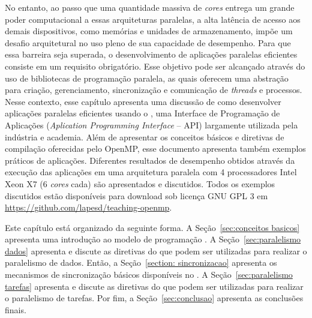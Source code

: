 \documentclass{SBCbookchapter}
\begin{document}
	No entanto, ao passo que uma quantidade massiva de \textit{cores}
	entrega um grande poder computacional a essas arquiteturas
	paralelas, a alta latência de acesso aos demais dispositivos, como
	memórias e unidades de armazenamento, impõe um desafio arquitetural
	no uso pleno de sua capacidade de desempenho. Para que essa barreira
	seja superada, o desenvolvimento de aplicações paralelas eficientes
	consiste em um requisito obrigatório. Esse objetivo pode ser
	alcançado através do uso de bibliotecas de programação paralela, as
	quais oferecem uma abstração para criação, gerenciamento,
	sincronização e comunicação de \textit{threads} e processos. Nesse
	contexto, esse capítulo apresenta uma discussão de como desenvolver
	aplicações paralelas eficientes usando o \openmp, uma Interface de
	Programação de Aplicações (\textit{Aplication Programming Interface}
	-- API) largamente utilizada pela indústria e academia. Além de apresentar
	os conceitos básicos e diretivas de compilação oferecidas pelo OpenMP,
	esse documento apresenta também exemplos práticos de aplicações.
	Diferentes resultados de desempenho obtidos através da execução
	das aplicações em uma arquitetura paralela com 4 processadores
	Intel Xeon X7 (6 \textit{cores} cada) são apresentados e discutidos.
	Todos os exemplos discutidos estão disponíveis para download sob
	licença GNU GPL 3 em \url{https://github.com/lapesd/teaching-openmp}.
	
	Este capítulo está organizado da seguinte forma. A
	Seção~\ref{sec:conceitos basicos} apresenta uma introdução ao modelo
	de programação \openmp.  A Seção~\ref{sec:paralelismo dados}
	apresenta e discute as diretivas do \openmp que podem ser utilizadas
	para realizar o paralelismo de dados. Então, a Seção~\ref{section:
	sincronizacao} apresenta os mecanismos de sincronização básicos
	disponíveis no \openmp. A Seção~\ref{sec:paralelismo tarefas}
	apresenta e discute as diretivas do \openmp que podem ser utilizadas
	para realizar o paralelismo de tarefas. Por fim, a Seção~\ref{sec:conclusao}
	apresenta as conclusões finais.
\end{document}
